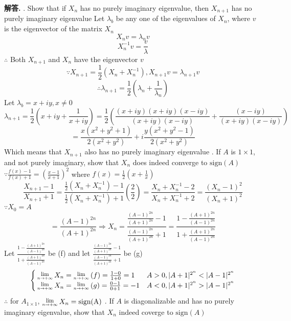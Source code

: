 \documentclass[12pt, a4paper, oneside]{article}
\newenvironment{solution}{\par\noindent\textbf{解答. }}{\par}
\newcommand{\Lim}[1]{\raisebox{0.5ex}{\scalebox{0.8}{$\displaystyle \lim_{#1}\;$}}}
\begin{document}
\begin{CJK}{UTF8}{gbsn}
\begin{solution} . Show that if $X_n$ has no purely imaginary eigenvalue, then $X_{n+1}$ has no purely imaginary eigenvalue \newline
  Let $\lambda_b$ be any one of the eigenvalues of $X_n$, where $v$ is the eigenvector of the matrix $X_n$
  $$X_nv = \lambda_nv$$
  $$X_n^{-1}v=\frac{v}{\lambda}$$
  $\therefore$ Both $X_{n+1}$ and $X_n$ have the eigenvector $v$
  $$\because X_{n+1} = \frac{1}{2}\left( X_n + X^{-1}_n\right), X_{n+1}v=\lambda_{n+1}v$$
  $$\therefore \lambda_{n+1}=\frac{1}{2}\left(\lambda_n + \frac{1}{\lambda_n}\right)$$
  Let $\lambda_b = x+iy, x \neq 0$
  $$\lambda_{n+1}=\frac{1}{2}\left(x+iy + \frac{1}{x+iy}\right)= \frac{1}{2}\left(\frac{(x+iy)(x+iy)(x-iy)}{(x+iy)(x-iy)} + \frac{(x-iy)}{(x+iy)(x-iy)}\right)$$
  $$=\frac{x(x^2+y^2 + 1)}{2(x^2+y^2)} + i\frac{y(x^2+y^2-1)}{2(x^2+y^2)}$$
  Which means that $X_{n+1}$ also has no purely imaginary eigenvalue . If $A$ is $1\times 1$, and not purely imaginary, show that $X_n$ does indeed converge to $\text{sign}(A)$ \newline
  $\because \frac{f(x)-1}{f(x)+1} = (\frac{x-1}{x+1})^2$ where $f(x)=\frac{1}{2}\left(x+\frac{1}{x}\right)$
  $$ \frac{X_{n+1} - 1}{X_{n+1} + 1} = \frac{\frac{1}{2}(X_n + X_n^{-1}) -1}{\frac{1}{2}(X_n + X_n^{-1}) +1} \left(\frac{2}{2}\right) = \frac{X_n + X_n^{-1} -2}{X_n + X_n^{-1}+2} = \frac{(X_n - 1)^2}{(X_n + 1)^2}$$
  $\because X_0 = A$
  $$= \frac{(A-1)^{2n}}{(A+1)^{2n}} \Rightarrow X_n = \frac{\frac{(A-1)^{2n}}{(A+1)^{2n}} - 1}{\frac{(A-1)^{2n}}{(A+1)^{2n}} + 1} = \frac{1 - \frac{(A+1)^{2n}}{(A-1)^{2n}}}{1 + \frac{(A+1)^{2n}}{(A-1)^{2n}}} $$
  Let $\frac{1 - \frac{(A+1)^{2n}}{(A-1)^{2n}}}{1 + \frac{(A+1)^{2n}}{(A-1)^{2n}}}$ be (f) and let $\frac{\frac{(A-1)^{2n}}{(A+1)^{2n}} - 1}{\frac{(A-1)^{2n}}{(A+1)^{2n}} + 1}$ be (g)
  $$\begin{cases}
    \Lim{n\rightarrow + \infty} X_n = \Lim{n\rightarrow + \infty} (f)  = \frac{1 - 0}{1 + 0}  = 1&  A > 0, |A+1|^{2^n} < |A-1|^{2^n} \\
    \Lim{n\rightarrow + \infty} X_n = \Lim{n\rightarrow + \infty} (g)  = \frac{0 - 1}{0 + 1}  = -1&  A < 0, |A+1|^{2^n} > |A-1|^{2^n}
  \end{cases}
  $$
  $\therefore$ for $A_{1\times 1}$, $\Lim{n\rightarrow + \infty} X_n = \text{sign(A)}$ . If $A$ is diagonalizable and has no purely imaginary eigenvalue, show that $X_n$ indeed coverge to $\text{sign}(A)$ \newline

\end{solution}
\end{CJK}
\end{document}
